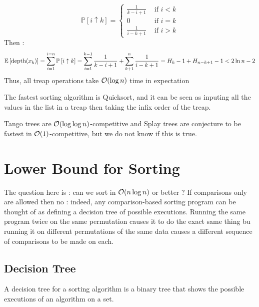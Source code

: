 \documentclass{cours}
\begin{document}
\begin{corollary}
    \[\mathbb{P}\left[i \uparrow k\right] = 
    \left\{
        \begin{aligned}
            \frac{1}{k - i + 1} &\text{ if } i < k\\
            0 & \text{ if } i = k\\
            \frac{1}{i - k + 1} & \text{ if } i > k
        \end{aligned}
    \right.
    \]
    Then : 
    \[
        \mathbb{E}\left[\textmd{depth}(x_{k})\right] = \sum_{i = 1}^{i = n}\mathbb{P}\left[i \uparrow k\right] = \sum_{i = 1}^{k - 1}\frac{1}{k - i + 1} + \sum_{k+1}^{n}\frac{1}{i - k + 1} = H_{k} - 1 + H_{n - k + 1} - 1 < 2 \ln n - 2
    \]
    Thus, all treap operations take $\mathcal{O}(\log n)$ time in expectation
\end{corollary}

\begin{remark}
    The fastest sorting algorithm is Quicksort, and it can be seen as inputing all the values in the list in a treap then taking the infix order of the treap. 
\end{remark}

\begin{remark}
    Tango trees are $\mathcal{O}(\log \log n)$-competitive and Splay trees are conjecture to be fastest in $\mathcal{O}(1)$-competitive, but we do not know if this is true. 
\end{remark}

\section{Lower Bound for Sorting}
The question here is : can we sort in $\mathcal{O}(n\log n)$ or better ?
If comparisons only are allowed then no : indeed, any comparison-based sorting program can be thought of as defining a decision tree of possible executions. Running the same program twice on the same permutation causes it to do the exact same thing bu running it on different permutations of the same data causes a different sequence of comparisons to be made on each. 

\subsection{Decision Tree}
\begin{definition}
    A decision tree for a sorting algorithm is a binary tree that shows the possible executions of an algorithm on a set.
\end{definition}
\end{document}
